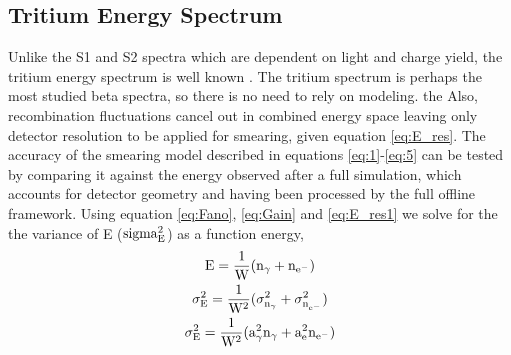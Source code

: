 





\subsection{Tritium Energy Spectrum}

Unlike the S1 and S2 spectra which are dependent on light and charge yield, the tritium energy spectrum is well known \cite{Tritium_Eq}. The tritium spectrum is perhaps the most studied beta spectra, so there is no need to rely on modeling. the  Also, recombination fluctuations cancel out in combined energy space leaving only detector resolution to be applied for smearing, given equation \ref{eq:E_res}. The accuracy of the smearing model described in equations \ref{eq:1}-\ref{eq:5} can be tested by comparing it against the energy observed after a full simulation, which accounts for detector geometry and having been processed by the full offline framework. Using equation \ref{eq:Fano}, \ref{eq:Gain} and \ref{eq:E_res1} we solve for the the variance of E ($\rm sigma_{E}^2$) as a function energy,
\begin{gather}
\label{eq:E_res1} \rm E= \frac{1}{W}(n_\gamma + n_{e^-}) \\
 \rm \sigma_{E}^2= \frac{1}{W^2}(\sigma_{n_\gamma}^2 + \sigma_{n_{e^-}}^2) \\ 
 \rm \sigma_{E}^2= \frac{1}{W^2}(a_\gamma^2 n_\gamma + a_e^2 n_{e^-})
\label{eq:E_res}
\end{gather}

